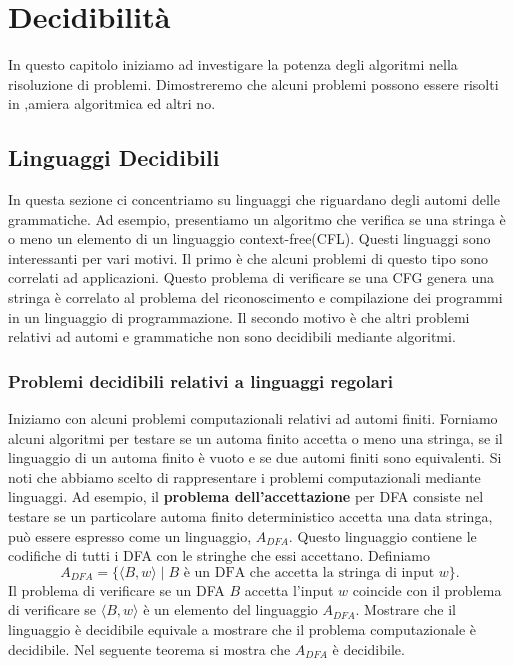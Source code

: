 \documentclass{article}
\begin{document}
\section{Decidibilità}
In questo capitolo iniziamo ad investigare la potenza degli algoritmi nella risoluzione di problemi.
Dimostreremo che alcuni problemi possono essere risolti in ,amiera algoritmica ed altri no.

\subsection{Linguaggi Decidibili}

In questa sezione ci concentriamo su linguaggi che riguardano degli automi delle grammatiche.
Ad esempio, presentiamo un algoritmo che verifica se una stringa è o meno un elemento di un linguaggio context-free(CFL).
Questi linguaggi sono interessanti per vari motivi.
Il primo è che alcuni problemi di questo tipo sono correlati ad applicazioni.
Questo problema di verificare se una CFG genera una stringa è correlato al problema del riconoscimento e compilazione dei programmi in un linguaggio di programmazione.
Il secondo motivo è che altri problemi relativi ad automi e grammatiche non sono decidibili mediante algoritmi.

\subsubsection{Problemi decidibili relativi a linguaggi regolari}
Iniziamo con alcuni problemi computazionali relativi ad automi finiti.
Forniamo alcuni algoritmi per testare se un automa finito accetta o meno una stringa, se il linguaggio di un automa finito è vuoto e se due automi finiti sono equivalenti.
Si noti che abbiamo scelto di rappresentare i problemi computazionali mediante linguaggi.
Ad esempio, il \textbf{problema dell'accettazione} per DFA consiste nel testare se un particolare automa finito deterministico accetta una data stringa, può essere espresso come un linguaggio, $A_{DFA}$.
Questo linguaggio contiene le codifiche di tutti i DFA con le stringhe che essi accettano.
Definiamo 
$$
A_{DFA} = \{\langle B,w \rangle \mid B \text{ è un DFA che accetta la stringa di input } w \}.
$$
Il problema di verificare se un DFA $B$ accetta l'input $w$ coincide con il problema di verificare se $\langle B,w \rangle$ è un elemento del linguaggio $A_{DFA}$.
Mostrare che il linguaggio è decidibile equivale a mostrare che il problema computazionale è decidibile.
Nel seguente teorema si mostra che $A_{DFA}$ è decidibile.
\end{document}
